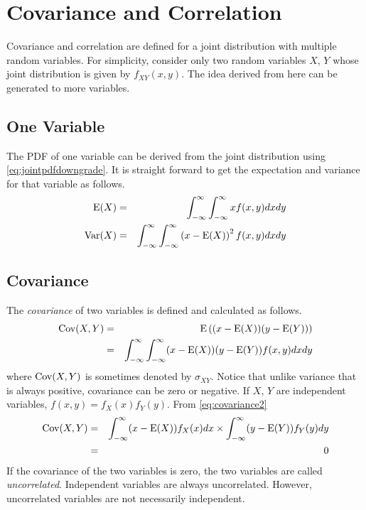 \section{Covariance and Correlation}

Covariance and correlation are defined for a joint distribution with multiple random variables. For simplicity, consider only two random variables $X$, $Y$ whose joint distribution is given by $f_{XY}(x, y)$. The idea derived from here can be generated to more variables.

\subsection{One Variable}

The PDF of one variable can be derived from the joint distribution using \eqref{eq:jointpdfdowngrade}. It is straight forward to get the expectation and variance for that variable as follows.
\begin{eqnarray}
  \textup{E}(X) &=& \int_{-\infty}^{\infty}\int_{-\infty}^{\infty}xf(x, y)dxdy \nonumber \\
  \textup{Var}(X) &=& \int_{-\infty}^{\infty}\int_{-\infty}^{\infty}\left(x-\textup{E}(X)\right)^2f(x, y)dxdy \nonumber
\end{eqnarray}

\subsection{Covariance}

The \textit{covariance} of two variables is defined and calculated as follows.
\begin{eqnarray}
  \textup{Cov}(X, Y) &=& \textup{E}\left((x - \textup{E}(X))(y - \textup{E}(Y))\right) \label{eq:covariance1} \\
  &=& \int_{-\infty}^{\infty}\int_{-\infty}^{\infty}(x - \textup{E}(X))(y - \textup{E}(Y))f(x, y)dxdy \label{eq:covariance2}
\end{eqnarray}
where $\textup{Cov}(X, Y)$ is sometimes denoted by $\sigma_{XY}$. Notice that unlike variance that is always positive, covariance can be zero or negative. If $X$, $Y$ are independent variables, $f(x,y) = f_X(x)f_Y(y)$. From \eqref{eq:covariance2}
\begin{eqnarray}
   \textup{Cov}(X, Y) &=& \int_{-\infty}^{\infty}(x - \textup{E}(X))f_X(x)dx \times \int_{-\infty}^{\infty}(y - \textup{E}(Y))f_Y(y)dy \nonumber \\
   &=& 0 \nonumber
\end{eqnarray}
If the covariance of the two variables is zero, the two variables are called \textit{uncorrelated}. Independent variables are always uncorrelated. However, uncorrelated variables are not necessarily independent.

